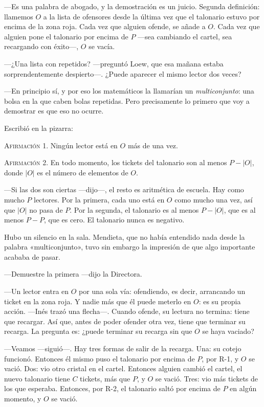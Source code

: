 ---Es una palabra de abogado, y la demostración es un juicio. Segunda definición: llamemos $O$ a la lista de ofensores desde la última vez que el talonario estuvo por encima de la zona roja. Cada vez que alguien ofende, se añade a $O$. Cada vez que alguien pone el talonario por encima de $P$ ---sea cambiando el cartel, sea recargando con éxito---\nobreak, $O$ se vacía.

---¿Una lista con repetidos? ---preguntó Loew, que esa mañana estaba sorprendentemente despierto---\nobreak. ¿Puede aparecer el mismo lector dos veces?

---En principio sí, y por eso los matemáticos la llamarían un \emph{multiconjunto}: una bolsa en la que caben bolas repetidas. Pero precisamente lo primero que voy a demostrar es que eso no ocurre.

Escribió en la pizarra:

\begin{pizarra}
\textsc{Afirmación 1.} Ningún lector está en $O$ más de una vez.

\smallskip
\textsc{Afirmación 2.} En todo momento, los tickets del talonario son al menos $P - |O|$, donde $|O|$ es el número de elementos de $O$.
\end{pizarra}

---Si las dos son ciertas ---dijo---\nobreak, el resto es aritmética de escuela. Hay como mucho $P$ lectores. Por la primera, cada uno está en $O$ como mucho una vez, así que $|O|$ no pasa de $P$. Por la segunda, el talonario es al menos $P - |O|$, que es al menos $P - P$, que es cero. El talonario nunca es negativo.

Hubo un silencio en la sala. Mendieta, que no había entendido nada desde la palabra «multiconjunto», tuvo sin embargo la impresión de que algo importante acababa de pasar.

---Demuestre la primera ---dijo la Directora.

\escena
---Un lector entra en $O$ por una sola vía: ofendiendo, es decir, arrancando un ticket en la zona roja. Y nadie más que él puede meterlo en $O$: es su propia acción. ---Inés trazó una flecha---\nobreak. Cuando ofende, su lectura no termina: tiene que recargar. Así que, antes de poder ofender otra vez, tiene que terminar su recarga. La pregunta es: ¿puede terminar su recarga sin que $O$ se haya vaciado?

---Veamos ---siguió---\nobreak. Hay tres formas de salir de la recarga. Una: su cotejo funcionó. Entonces él mismo puso el talonario por encima de $P$, por R-1, y $O$ se vació. Dos: vio otro cristal en el cartel. Entonces alguien cambió el cartel, el nuevo talonario tiene $C$ tickets, más que $P$, y $O$ se vació. Tres: vio más tickets de los que esperaba. Entonces, por R-2, el talonario saltó por encima de $P$ en algún momento, y $O$ se vació.

